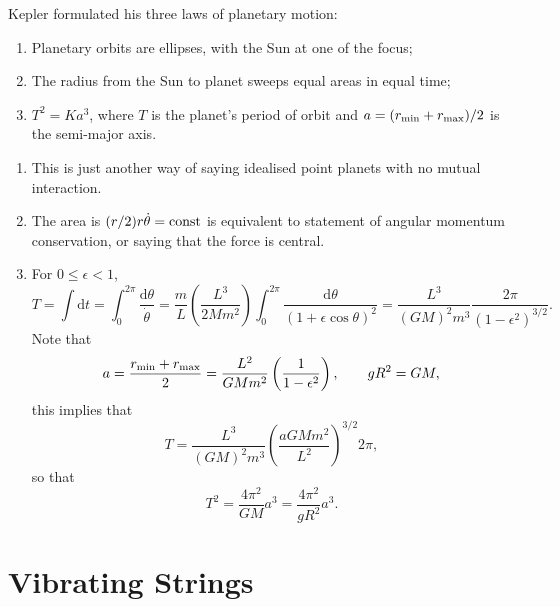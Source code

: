 \documentclass[letter-paper]{tufte-book}
\newenvironment{proof}[1][Proof]{\begin{trivlist}
\item[\hskip \labelsep {\bfseries #1}]}{\end{trivlist}}
\begin{document}
Kepler formulated his three laws of planetary motion:
\begin{enumerate}
  \item Planetary orbits are ellipses, with the Sun at one of the focus;
  \item The radius from the Sun to planet sweeps equal areas in equal time;
  \item $T^2 = Ka^3$, where $T$ is the planet's period of orbit and $a = (r_{\rm
  min} + r_{\rm max}) / 2$ is the semi-major axis.
\end{enumerate}
\begin{proof}
\begin{enumerate}
  \item This is just another way of saying idealised point planets with no
  mutual interaction.
  
  \item The area is $(r/2)r\dot{\theta} = \textnormal{const}$ is equivalent to
  statement of angular momentum conservation, or saying that the force is
  central.
  
  \item For $0 \leq \epsilon < 1$,
  \begin{equation*}
    T = \int\mathrm{d}t = \int_0^{2\pi} \frac{\mathrm{d}\theta}{\dot{\theta}}
      = \frac{m}{L} \left(\frac{L^3}{2Mm^2}\right) \int_0^{2\pi} \frac{\mathrm{d}\theta}{(1 + \epsilon \cos \theta)^2} = \frac{L^3}{(GM)^2 m^3} \frac{2\pi}{(1 - \epsilon^2)^{3/2}}.
  \end{equation*}
  Note that
  \begin{equation*}
    a = \frac{r_{\rm min} + r_{\rm max}}{2} = \frac{L^2}{GMm^2} \left(\frac{1}{1 - \epsilon^2}\right), \qquad gR^2 = GM,
  \end{equation*}
  this implies that
  \begin{equation*}
    T = \frac{L^3}{(GM)^2 m^3} \left(\frac{aGMm^2}{L^2}\right)^{3/2} 2\pi,
  \end{equation*}
  so that
  \begin{equation*}
    T^2 = \frac{4\pi^2}{GM}a^3 = \frac{4\pi^2}{gR^2} a^3.
  \end{equation*}
\end{enumerate}
\end{proof}


\chapter{Vibrating Strings}
\end{document}
